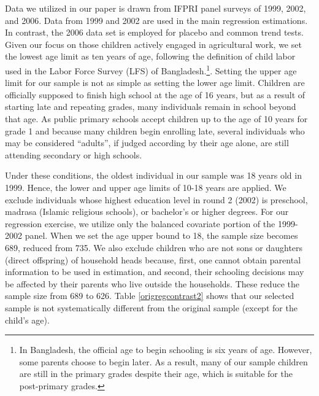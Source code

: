 \documentclass[12pt,letterpaper]{article}
\newcommand{\0}{\ensuremath{\mbox{\boldmath $0$}}}
\begin{document}
Data we utilized in our paper is drawn from IFPRI panel surveys of 1999, 2002, and 2006. Data from 1999 and 2002 are used in the main regression estimations. In contrast, the 2006 data set is employed for placebo and common trend tests. Given our focus on those children actively engaged in agricultural work, we set the lowest age limit as ten years of age, following the definition of child labor used in the Labor Force Survey (LFS) of Bangladesh.\footnote{In Bangladesh, the official age to begin schooling is six years of age. However, some parents choose to begin later. As a result, many of our sample children are still in the primary grades despite their age, which is suitable for the post-primary grades.}. Setting the upper age limit for our sample is not as simple as setting the lower age limit. Children are officially supposed to finish high school at the age of 16 years, but as a result of starting late and repeating grades, many individuals remain in school beyond that age. As public primary schools accept children up to the age of 10 years for grade 1 and because many children begin enrolling late, several individuals who may be considered  ``adults'',  if judged according by their age alone, are still attending secondary or high schools.

Under these conditions, the oldest individual in our sample was 18 years old in 1999. Hence, the lower and upper age limits of 10-18 years are applied. We exclude individuals whose highest education level in round 2 (2002) is preschool, madrasa (Islamic religious schools), or bachelor's or higher degrees. For our regression exercise, we utilize only the balanced covariate portion of the 1999-2002 panel. When we set the age upper bound to 18, the sample size becomes 689, reduced from 735. We also exclude children who are not sons or daughters (direct offspring) of household heads because, first, one cannot obtain parental information to be used in estimation, and second, their schooling decisions may be affected by their parents who live outside the households. These reduce the sample size from 689 to 626. Table \ref{origregcontrast2} shows that our selected sample is not systematically different from the original sample (except for the child's age). 
\end{document}
